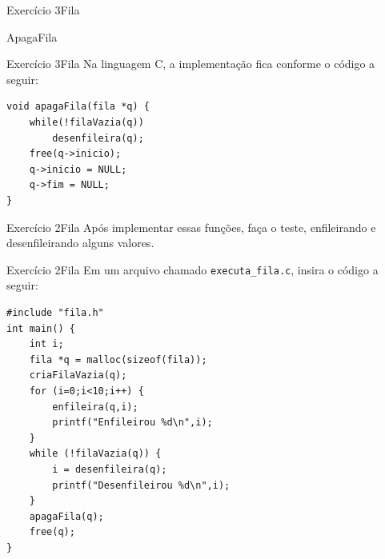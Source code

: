 \documentclass[aspectratio=169]{beamer}
\begin{document}
\begin{frame}[fragile]{Exercício 3}{Fila}
\begin{algorithm}[H]
\caption{ApagaFila} 
\label{ApagaFila}
\end{algorithm}
\end{frame}


\begin{frame}[fragile]{Exercício 3}{Fila}
Na linguagem C, a implementação fica conforme o código a seguir:
\begin{lstlisting}[style=CStyle]
void apagaFila(fila *q) {
    while(!filaVazia(q))
        desenfileira(q);
    free(q->inicio);
    q->inicio = NULL;
    q->fim = NULL;
}
\end{lstlisting}  
\end{frame}


\begin{frame}[fragile]{Exercício 2}{Fila}
Após implementar essas funções, faça o teste, enfileirando e desenfileirando alguns valores.
\end{frame}


\begin{frame}[fragile]{Exercício 2}{Fila}
Em um arquivo chamado \verb|executa_fila.c|, insira  o código a seguir:
\begin{lstlisting}[style=CStyle]
#include "fila.h"
int main() {
    int i;
    fila *q = malloc(sizeof(fila));
    criaFilaVazia(q);
    for (i=0;i<10;i++) {
        enfileira(q,i);
        printf("Enfileirou %d\n",i);
    } 
    while (!filaVazia(q)) {
        i = desenfileira(q);
        printf("Desenfileirou %d\n",i);
    }
    apagaFila(q);
    free(q);
}
\end{lstlisting}  
\end{frame}
\end{document}
